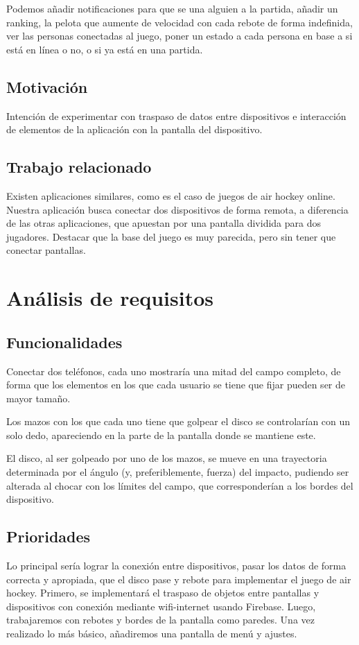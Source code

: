 \documentclass[a4paper,openright,12pt]{article}
\begin{document}
Podemos añadir notificaciones para que se una alguien a la partida, añadir un ranking, la pelota que aumente de velocidad con cada rebote de forma indefinida, ver las personas conectadas al juego, poner un estado a cada persona en base a si está en línea o no, o si ya está en una partida.
\subsection{Motivación}
Intención de experimentar con traspaso de datos entre dispositivos e interacción de elementos de la aplicación con la pantalla del dispositivo. 
\subsection{Trabajo relacionado}
Existen aplicaciones similares, como es el caso de juegos de air hockey online. Nuestra aplicación busca conectar dos dispositivos de forma remota, a diferencia de las otras aplicaciones, que apuestan por una pantalla dividida para dos jugadores. Destacar que la base del juego es muy parecida, pero sin tener que conectar pantallas.

\section{Análisis de requisitos}

\subsection{Funcionalidades}
Conectar dos teléfonos, cada uno mostraría una mitad del campo completo, de forma que los elementos en los que cada usuario se tiene que fijar pueden ser de mayor tamaño.
 
Los mazos con los que cada uno tiene que golpear el disco se controlarían con un solo dedo, apareciendo en la parte de la pantalla donde se mantiene este.
 
El disco, al ser golpeado por uno de los mazos, se mueve en una trayectoria determinada por el ángulo (y, preferiblemente, fuerza) del impacto, pudiendo ser alterada al chocar con los límites del campo, que corresponderían a los bordes del dispositivo.
\subsection{Prioridades}
Lo principal sería lograr la conexión entre dispositivos, pasar los datos de forma correcta y apropiada, que el disco pase y rebote para implementar el juego de air hockey.
Primero, se implementará el traspaso de objetos entre pantallas y dispositivos con conexión mediante wifi-internet usando Firebase.
Luego, trabajaremos con rebotes y bordes de la pantalla como paredes.
Una vez realizado lo más básico, añadiremos una pantalla de menú y ajustes. 
\end{document}
